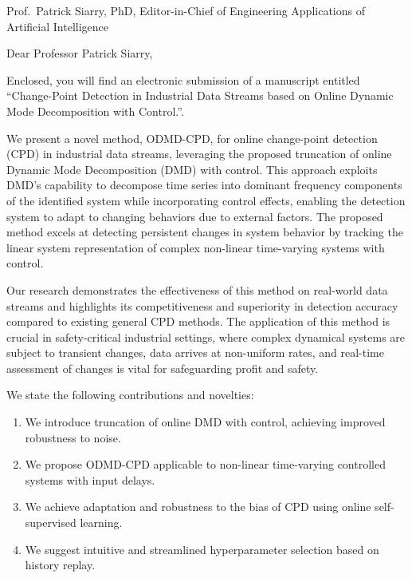 \documentclass{letter}
\begin{document}
\begin{letter}{Prof.~Patrick Siarry, PhD, Editor-in-Chief of Engineering Applications of Artificial Intelligence}

    \opening{Dear Professor Patrick Siarry,}

    Enclosed, you will find an electronic submission of a manuscript entitled ``Change-Point Detection in Industrial Data Streams based on Online Dynamic Mode Decomposition with Control.''.

    We present a novel method, ODMD-CPD, for online change-point detection (CPD) in industrial data streams, leveraging the proposed truncation of online Dynamic Mode Decomposition (DMD) with control. This approach exploits DMD's capability to decompose time series into dominant frequency components of the identified system while incorporating control effects, enabling the detection system to adapt to changing behaviors due to external factors. The proposed method excels at detecting persistent changes in system behavior by tracking the linear system representation of complex non-linear time-varying systems with control.

    Our research demonstrates the effectiveness of this method on real-world data streams and highlights its competitiveness and superiority in detection accuracy compared to existing general CPD methods. The application of this method is crucial in safety-critical industrial settings, where complex dynamical systems are subject to transient changes, data arrives at non-uniform rates, and real-time assessment of changes is vital for safeguarding profit and safety.

    We state the following contributions and novelties:
    \begin{enumerate}
        \item We introduce truncation of online DMD with control, achieving improved robustness to noise.
        \item We propose ODMD-CPD applicable to non-linear time-varying controlled systems with input delays.
        \item We achieve adaptation and robustness to the bias of CPD using online self-supervised learning.
        \item We suggest intuitive and streamlined hyperparameter selection based on history replay.
    \end{enumerate}


\end{letter}
\end{document}
